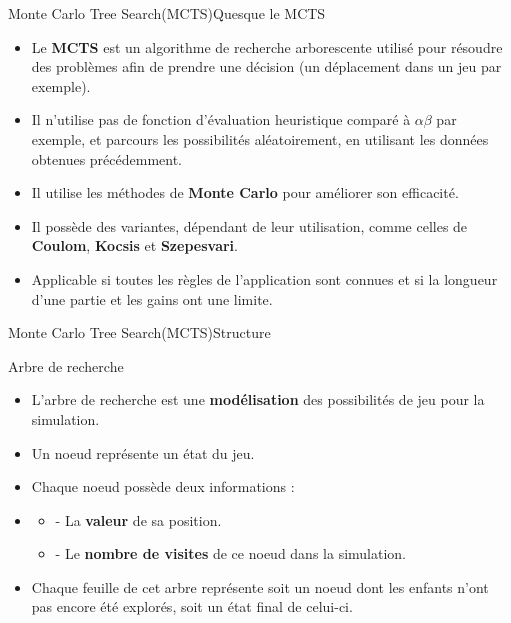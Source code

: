 \begin{frame}{Monte Carlo Tree Search(MCTS)}{Quesque le MCTS}
	\begin{block}{}
		\begin{itemize}
			\item Le \textbf{MCTS} est un algorithme de recherche arborescente utilisé pour résoudre des problèmes afin de prendre une décision (un déplacement dans un jeu par exemple).
			\item Il n'utilise pas de fonction d'évaluation heuristique comparé à \textbf{$\alpha$$\beta$} par exemple, et parcours les possibilités aléatoirement, en utilisant les données obtenues précédemment.
			\item Il utilise les méthodes de \textbf{Monte Carlo} pour améliorer son efficacité.
			\item Il possède des variantes, dépendant de leur utilisation, comme celles de \textbf{Coulom}, \textbf{Kocsis} et \textbf{Szepesvari}.
			\item Applicable si toutes les règles de l'application sont connues et si la longueur d'une partie et les gains ont une limite.
		\end{itemize}
	\end{block}
\end{frame}

\begin{frame}{Monte Carlo Tree Search(MCTS)}{Structure}
	\begin{block}{Arbre de recherche}
		\begin{itemize}
			\item L'arbre de recherche est une \textbf{modélisation} des possibilités de jeu pour la simulation.
			\item Un noeud représente un état du jeu.
			\item Chaque noeud possède deux informations :
			\item\begin{itemize}
				      \item - La \textbf{valeur} de sa position.
				      \item - Le \textbf{nombre de visites} de ce noeud dans la simulation.
			      \end{itemize}
			\item Chaque feuille de cet arbre représente soit un noeud dont les enfants n'ont pas encore été explorés, soit un état final de celui-ci.
		\end{itemize}
	\end{block}
\end{frame}

